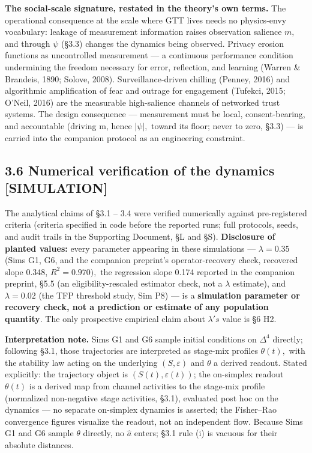 \documentclass[11pt,twocolumn]{article}
\theoremstyle{gttdef}
\theoremstyle{gttplain}
\begin{document}
\textbf{The social-scale signature, restated in the theory's own terms.} The operational consequence at the scale where GTT lives needs no physics-envy vocabulary: leakage of measurement information raises observation salience $m,$ and through $\psi$ (\S{}3.3) changes the dynamics being observed. Privacy erosion functions as uncontrolled measurement --- a continuous performance condition undermining the freedom necessary for error, reflection, and learning (Warren \& Brandeis, 1890; Solove, 2008). Surveillance-driven chilling (Penney, 2016) and algorithmic amplification of fear and outrage for engagement (Tufekci, 2015; O'Neil, 2016) are the measurable high-salience channels of networked trust systems. The design consequence --- measurement must be local, consent-bearing, and accountable (driving m, hence $|\psi|,$ toward its floor; never to zero, \S{}3.3) --- is carried into the companion protocol as an engineering constraint.

\subsection*{3.6 Numerical verification of the dynamics [SIMULATION]}

The analytical claims of \S{}3.1 -- 3.4 were verified numerically against pre-registered criteria (criteria specified in code before the reported runs; full protocols, seeds, and audit trails in the Supporting Document, \S{}L and \S{}S). \textbf{Disclosure of planted values:} every parameter appearing in these simulations --- $\lambda = 0.35$ (Sims G1, G6, and the companion preprint's operator-recovery check, recovered slope 0.348, $R^{2} = 0.970),$ the regression slope 0.174 reported in the companion preprint, \S{}5.5 (an eligibility-rescaled estimator check, not a $\lambda$ estimate), and $\lambda = 0.02$ (the TFP threshold study, Sim P8) --- is a \textbf{simulation parameter or recovery check, not a prediction or estimate of any population quantity}. The only prospective empirical claim about $\lambda's$ value is \S{}6 H2.

\textbf{Interpretation note.} Sims G1 and G6 sample initial conditions on $\Delta^{4}$ directly; following \S{}3.1, those trajectories are interpreted as stage-mix profiles $\theta(t),$ with the stability law acting on the underlying $(S, \varepsilon)$ and $\theta$ a derived readout. Stated explicitly: the trajectory object is $(S(t), \varepsilon(t))$; the on-simplex readout $\theta(t)$ is a derived map from channel activities to the stage-mix profile (normalized non-negative stage activities, \S{}3.1), evaluated post hoc on the dynamics --- no separate on-simplex dynamics is asserted; the Fisher--Rao convergence figures visualize the readout, not an independent flow. Because Sims G1 and G6 sample $\theta$ directly, no $\hat{a}$ enters; \S{}3.1 rule (i) is vacuous for their absolute distances.
\end{document}
